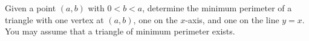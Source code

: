 Given a point $(a,b)$ with $0<b<a$, determine the minimum perimeter of a
triangle with one vertex at $(a,b)$, one on the $x$-axis, and one on the
line $y=x$.  You may assume that a triangle of minimum perimeter exists.
